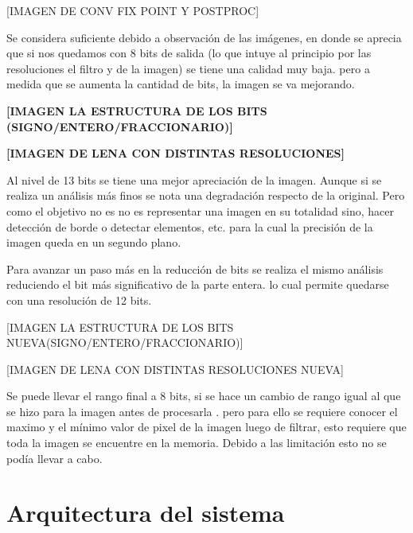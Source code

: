 \documentclass[conference,compsoc]{IEEEtran}
\begin{document}
[IMAGEN DE CONV FIX POINT Y POSTPROC]

Se considera suficiente debido a observación de las imágenes, en donde se
aprecia que si nos quedamos con 8 bits de salida (lo que intuye al principio por
las resoluciones el filtro y de la imagen)  se tiene una calidad muy baja. pero
a medida que se aumenta la cantidad de bits, la imagen se va mejorando.

\textbf{[IMAGEN LA ESTRUCTURA DE LOS BITS (SIGNO/ENTERO/FRACCIONARIO)]}

\textbf{[IMAGEN DE LENA CON DISTINTAS RESOLUCIONES]}


Al nivel de 13 bits se tiene una mejor apreciación de la imagen. Aunque si se
realiza un análisis más finos se nota una degradación respecto de la original.
Pero como el objetivo no es no es representar una imagen en su totalidad sino,
hacer detección de borde o detectar elementos, etc. para la cual la precisión de
la imagen queda en un segundo plano.

Para avanzar un paso más en la reducción de bits se realiza el mismo análisis
reduciendo el bit más significativo de la parte entera. lo cual permite quedarse
con una resolución de 12 bits.

[IMAGEN LA ESTRUCTURA DE LOS BITS NUEVA(SIGNO/ENTERO/FRACCIONARIO)]

[IMAGEN DE LENA CON DISTINTAS RESOLUCIONES NUEVA]

Se puede llevar el rango final a 8 bits, si se hace un cambio de rango igual al
que se hizo para la imagen antes de procesarla . pero para ello se requiere
conocer el maximo y el mínimo valor de pixel de la imagen luego de filtrar, esto
requiere que toda la imagen se encuentre en la memoria. Debido a las limitación
esto no se podía llevar a cabo.

\section{Arquitectura del sistema}
\end{document}
